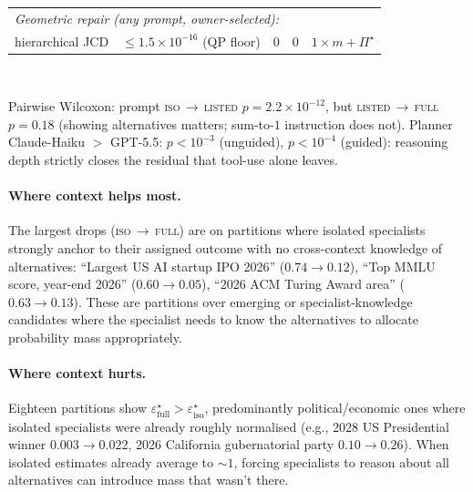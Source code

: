 \documentclass{article}
\theoremstyle{plain}
\theoremstyle{definition}
\theoremstyle{remark}
\newcommand{\eps}{\varepsilon}
\begin{document}
\begin{center}
\begin{tabular}{lcccc}
\multicolumn{5}{l}{\emph{Geometric repair (any prompt, owner-selected):}}\\
hierarchical JCD              & $\le 1.5\!\times\!10^{-16}$ (QP floor) & $0$ & $0$ & $1\!\times\!m + \Pi^\star$ \\
\bottomrule
\end{tabular}\\[2pt]
{\small Pairwise Wilcoxon: prompt \textsc{iso}\,$\to$\,\textsc{listed}
$p\!=\!2.2\!\times\!10^{-12}$, but \textsc{listed}\,$\to$\,\textsc{full}
$p\!=\!0.18$ (showing alternatives matters; sum-to-$1$ instruction
does not). Planner Claude-Haiku $>$ GPT-5.5:
$p\!<\!10^{-3}$ (unguided), $p\!<\!10^{-4}$ (guided): reasoning depth
strictly closes the residual that tool-use alone leaves.\par}
\end{center}

\paragraph{Where context helps most.}
The largest drops (\textsc{iso}\,$\to$\,\textsc{full}) are on
partitions where isolated specialists strongly anchor to their
assigned outcome with no cross-context knowledge of alternatives:
``Largest US AI startup IPO 2026'' ($0.74\!\to\!0.12$), ``Top MMLU
score, year-end 2026'' ($0.60\!\to\!0.05$), ``2026 ACM Turing Award area''
($0.63\!\to\!0.13$). These are partitions over emerging or
specialist-knowledge candidates where the specialist needs to know
the alternatives to allocate probability mass appropriately.

\paragraph{Where context hurts.}
Eighteen partitions show $\eps^\star_{\text{full}}\!>\!\eps^\star_{\text{iso}}$,
predominantly political/economic ones where isolated specialists were
already roughly normalised (e.g., 2028 US Presidential winner
$0.003\!\to\!0.022$, 2026 California gubernatorial party
$0.10\!\to\!0.26$). When isolated estimates already average to $\sim 1$,
forcing specialists to reason about all alternatives can introduce
mass that wasn't there.
\end{document}
